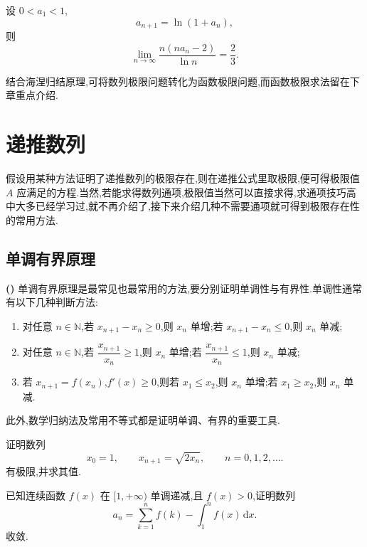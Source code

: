 \documentclass[../数学分析培优讲义.tex]{subfiles}
\begin{document}
\begin{example}
设 $0<a_1<1$,
\[
a_{n+1}=\ln(1+a_n),
\]
则
\[
\lim\limits_{n\to\infty}\dfrac{n(na_n-2)}{\ln n}=\dfrac{2}{3}.
\]
\end{example}
\exampleblank


\newpage


结合海涅归结原理,可将数列极限问题转化为函数极限问题,而函数极限求法留在下章重点介绍.


\newpage

\section{递推数列}

假设用某种方法证明了递推数列的极限存在,则在递推公式里取极限,便可得极限值 $A$ 应满足的方程.当然,若能求得数列通项,极限值当然可以直接求得,求通项技巧高中大多已经学习过,就不再介绍了,接下来介绍几种不需要通项就可得到极限存在性的常用方法.


\newpage

\subsection{单调有界原理}

\noindent\textbf{(\markstar)} 单调有界原理是最常见也最常用的方法,要分别证明单调性与有界性.单调性通常有以下几种判断方法:

\begin{enumerate}[label=(\arabic*)]
  \item 对任意 $n\in\mathbb N$,若 $x_{n+1}-x_n\geq0$,则 $x_n$ 单增;若 $x_{n+1}-x_n\leq0$,则 $x_n$ 单减;
  \item 对任意 $n\in\mathbb N$,若 $\dfrac{x_{n+1}}{x_n}\geq1$,则 $x_n$ 单增;若 $\dfrac{x_{n+1}}{x_n}\leq1$,则 $x_n$ 单减;
  \item 若 $x_{n+1}=f(x_n)$,$f'(x)\geq0$,则若 $x_1\leq x_2$,则 $x_n$ 单增;若 $x_1\geq x_2$,则 $x_n$ 单减.
\end{enumerate}

此外,数学归纳法及常用不等式都是证明单调、有界的重要工具.

\begin{example}
证明数列
\[
x_0=1,\qquad x_{n+1}=\sqrt{2x_n},\qquad n=0,1,2,\ldots.
\]
有极限,并求其值.
\end{example}
\exampleblank

\begin{example}
已知连续函数 $f(x)$ 在 $\lbrack 1,+\infty)$ 单调递减,且 $f(x)>0$,证明数列
\[
a_n=\sum\limits_{k=1}^n f(k)-\int_1^n f(x)\,\mathrm{d}x.
\]
收敛.
\end{example}
\exampleblank
\end{document}
